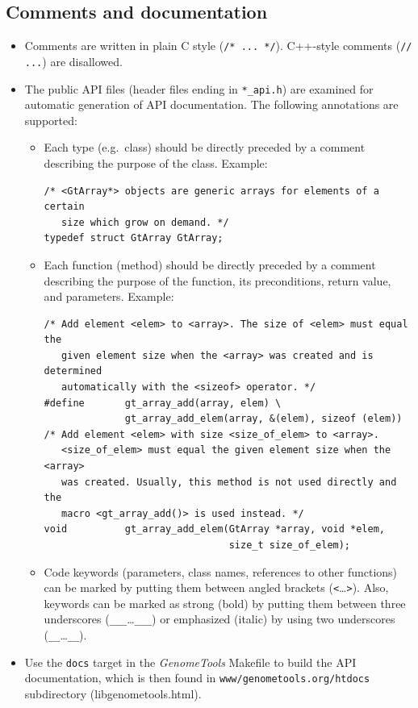 \documentclass[11pt,final]{article}
\newcommand{\keyword}[1]{\lstinline{#1}}
\newcommand{\Gt}[0]{\emph{GenomeTools}\xspace}
\begin{document}
\subsection{Comments and documentation}
\label{documentation}
\begin{itemize}
\item
Comments are written in plain C style (\keyword{/* ... */}). C++-style
comments (\keyword{// ...}) are disallowed.
\item
The public API files (header files ending in \keyword{*_api.h}) are examined for
automatic generation of API documentation. The following annotations are
supported:
\begin{itemize}
\item
Each type (e.g.\ class) should be directly preceded by a comment describing the
purpose of the class. Example:

\begin{lstlisting}
/* <GtArray*> objects are generic arrays for elements of a certain
   size which grow on demand. */
typedef struct GtArray GtArray;
\end{lstlisting}

\item
Each function (method) should be directly preceded by a comment describing the
purpose of the function, its preconditions, return value, and parameters.
Example:

\begin{lstlisting}
/* Add element <elem> to <array>. The size of <elem> must equal the
   given element size when the <array> was created and is determined
   automatically with the <sizeof> operator. */
#define       gt_array_add(array, elem) \
              gt_array_add_elem(array, &(elem), sizeof (elem))
/* Add element <elem> with size <size_of_elem> to <array>.
   <size_of_elem> must equal the given element size when the <array>
   was created. Usually, this method is not used directly and the
   macro <gt_array_add()> is used instead. */
void          gt_array_add_elem(GtArray *array, void *elem,
                                size_t size_of_elem);
\end{lstlisting}
\item
Code keywords (parameters, class names, references to other functions) can be
marked by putting them between angled brackets (\keyword{<}\dots\keyword{>}).
Also, keywords can be marked as strong (bold) by putting them between
three underscores (\keyword{___}\dots\keyword{___}) or emphasized (italic) by
using two underscores (\keyword{__}\dots\keyword{__}).
\end{itemize}
\item
Use the \keyword{docs} target in the \Gt Makefile to build the API
documentation, which is then found in \keyword{www/genometools.org/htdocs}
subdirectory (libgenometools.html).
\end{itemize}
\end{document}
